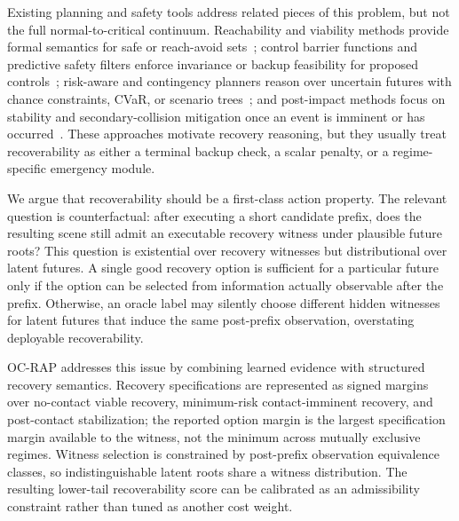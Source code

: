 \documentclass[conference]{IEEEtran}
\begin{document}
Existing planning and safety tools address related pieces of this problem, but not the full normal-to-critical continuum.  Reachability and viability methods provide formal semantics for safe or reach-avoid sets~\cite{bansal2017hamilton,bansal2021deepreach,lin2023generating}; control barrier functions and predictive safety filters enforce invariance or backup feasibility for proposed controls~\cite{ames2019control,koller2018learning,wabersich2021predictive,tearle2021predictive,kim2026backup}; risk-aware and contingency planners reason over uncertain futures with chance constraints, CVaR, or scenario trees~\cite{uryasev2000conditional,hakobyan2021wasserstein,safaoui2024distributionally,li2023marc,mustafa2024racp}; and post-impact methods focus on stability and secondary-collision mitigation once an event is imminent or has occurred~\cite{bosia2024real,wang2023integrated,parseh2023motion,wang2024post}.  These approaches motivate recovery reasoning, but they usually treat recoverability as either a terminal backup check, a scalar penalty, or a regime-specific emergency module.

We argue that recoverability should be a first-class action property.  The relevant question is counterfactual: after executing a short candidate prefix, does the resulting scene still admit an executable recovery witness under plausible future roots?  This question is existential over recovery witnesses but distributional over latent futures.  A single good recovery option is sufficient for a particular future only if the option can be selected from information actually observable after the prefix.  Otherwise, an oracle label may silently choose different hidden witnesses for latent futures that induce the same post-prefix observation, overstating deployable recoverability.

OC-RAP addresses this issue by combining learned evidence with structured recovery semantics.  Recovery specifications are represented as signed margins over no-contact viable recovery, minimum-risk contact-imminent recovery, and post-contact stabilization; the reported option margin is the largest specification margin available to the witness, not the minimum across mutually exclusive regimes.  Witness selection is constrained by post-prefix observation equivalence classes, so indistinguishable latent roots share a witness distribution.  The resulting lower-tail recoverability score can be calibrated as an admissibility constraint rather than tuned as another cost weight.
\end{document}
